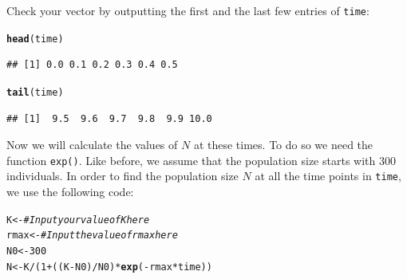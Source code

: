 \documentclass{article}\usepackage[]{graphicx}\usepackage[]{color}
\makeatletter
\newcommand{\hlnum}[1]{\textcolor[rgb]{0.686,0.059,0.569}{#1}}%
\newcommand{\hlcom}[1]{\textcolor[rgb]{0.678,0.584,0.686}{\textit{#1}}}%
\newcommand{\hlopt}[1]{\textcolor[rgb]{0,0,0}{#1}}%
\newcommand{\hlstd}[1]{\textcolor[rgb]{0.345,0.345,0.345}{#1}}%
\newcommand{\hlkwb}[1]{\textcolor[rgb]{0.69,0.353,0.396}{#1}}%
\newcommand{\hlkwd}[1]{\textcolor[rgb]{0.737,0.353,0.396}{\textbf{#1}}}%
\newenvironment{kframe}{%
 \def\at@end@of@kframe{}%
 \ifinner\ifhmode%
  \def\at@end@of@kframe{\end{minipage}}%
  \begin{minipage}{\columnwidth}%
 \fi\fi%
 \def\FrameCommand##1{\hskip\@totalleftmargin \hskip-\fboxsep
 \colorbox{shadecolor}{##1}\hskip-\fboxsep
     \hskip-\linewidth \hskip-\@totalleftmargin \hskip\columnwidth}%
 \MakeFramed {\advance\hsize-\width
   \@totalleftmargin\z@ \linewidth\hsize
   \@setminipage}}%
 {\par\unskip\endMakeFramed%
 \at@end@of@kframe}
\newenvironment{knitrout}{}{} %
\makeatother
\begin{document}
\noindent Check your vector by outputting the first and the last few entries of \texttt{time}:
\begin{knitrout}
\color{fgcolor}\begin{kframe}
\begin{alltt}
\hlkwd{head}\hlstd{(time)}
\end{alltt}
\begin{verbatim}
## [1] 0.0 0.1 0.2 0.3 0.4 0.5
\end{verbatim}
\begin{alltt}
\hlkwd{tail}\hlstd{(time)}
\end{alltt}
\begin{verbatim}
## [1]  9.5  9.6  9.7  9.8  9.9 10.0
\end{verbatim}
\end{kframe}
\end{knitrout}
Now we will calculate the values of $N$ at these times. To do so we need the function \texttt{exp()}. Like before, we assume that the population size starts with $300$ individuals. In order to find the population size $N$ at all the time points in \texttt{time}, we use the following code:
\begin{knitrout}
\color{fgcolor}\begin{kframe}
\begin{alltt}
\hlstd{K} \hlkwb{<-}     \hlcom{# Input your value of K here}
\hlstd{rmax} \hlkwb{<-}  \hlcom{# Input the value of rmax here}
\hlstd{N0} \hlkwb{<-} \hlnum{300}
\hlstd{N} \hlkwb{<-} \hlstd{K} \hlopt{/} \hlstd{(}\hlnum{1} \hlopt{+} \hlstd{((K} \hlopt{-} \hlstd{N0)} \hlopt{/} \hlstd{N0)} \hlopt{*} \hlkwd{exp}\hlstd{(}\hlopt{-}\hlstd{rmax} \hlopt{*} \hlstd{time))}
\end{alltt}
\end{kframe}
\end{knitrout}
\end{document}

